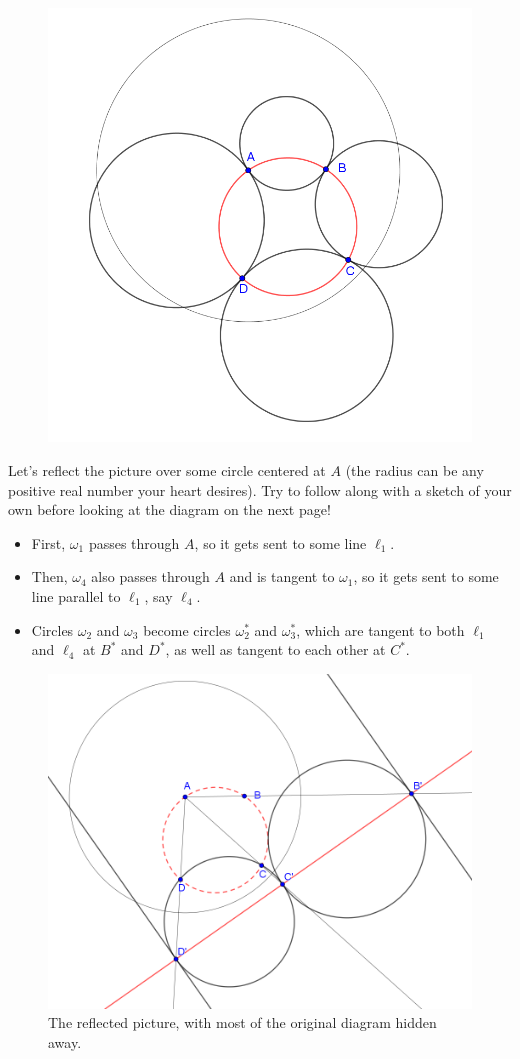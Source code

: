 \documentclass{scrartcl}
\providecommand{\ii}{\item}
\begin{document}
\begin{figure}[h]
	\centering
	\includegraphics[width=0.5\linewidth]{inversion_egmo824}
	\label{fig:inversionegmo824}
\end{figure}

Let's reflect the picture over some circle centered at $A$
(the radius can be any positive real number your heart desires).
Try to follow along with a sketch of your own before looking at
the diagram on the next page!
\begin{itemize}
	\ii First, $\omega_1$ passes through $A$, so it gets sent to some line $\ell_1$.
	\ii Then, $\omega_4$ also passes through $A$ and is tangent to $\omega_1$,
	so it gets sent to some line parallel to $\ell_1$, say $\ell_4$.
	\ii Circles $\omega_2$ and $\omega_3$ become circles
	$\omega_2^\ast$ and $\omega_3^\ast$, which are tangent to both
	$\ell_1$ and $\ell_4$ at $B^\ast$ and $D^\ast$,
	as well as tangent to each other at $C^\ast$.
\end{itemize}
\pagebreak
\begin{figure}[h]
	\centering
	\includegraphics[width=0.7\linewidth]{inversion_egmo824img}
	\caption{The reflected picture, with most of the original diagram
	hidden away.}
	\label{fig:inversionegmo824img}
\end{figure}
\end{document}
